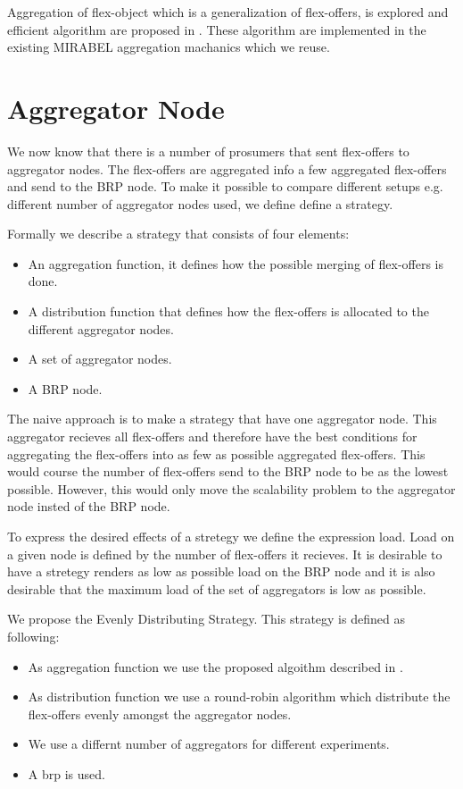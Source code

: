 \documentclass{ifacconf}
\begin{document}
Aggregation of flex-object which is a generalization of flex-offers, is explored and efficient algorithm are proposed in \cite{ssdbm}. 
These algorithm are implemented in the existing MIRABEL aggregation machanics which we reuse.

\section{Aggregator Node}

We now know that there is a number of prosumers that sent flex-offers to aggregator nodes. 
The flex-offers are aggregated info a few aggregated flex-offers and send to the BRP node.
To make it possible to compare different setups e.g. different number of aggregator nodes used, we define define a strategy.

Formally we describe a strategy that consists of four elements:
\begin{itemize}
	\item An aggregation function, it defines how the possible merging of flex-offers is done.
	\item A distribution function that defines how the flex-offers is allocated to the different aggregator nodes.
	\item A set of aggregator nodes.
	\item A BRP node.
\end{itemize} 


The naive approach is to make a strategy that have one aggregator node. 
This aggregator recieves all flex-offers and therefore have the best conditions for aggregating the flex-offers into as few as possible aggregated flex-offers. 
This would course the number of flex-offers send to the BRP node to be as the lowest possible. 
However, this would only move the scalability problem to the aggregator node insted of the BRP node. 

To express the desired effects of a stretegy we define the expression load.
Load on a given node is defined by the number of flex-offers it recieves.
It is desirable to have a stretegy renders as low as possible load on the BRP node and it is also desirable that the maximum load of the set of aggregators is low as possible.  


We propose the Evenly Distributing Strategy.
This strategy is defined as following:
\begin{itemize}
	\item As aggregation function we use the proposed algoithm described in \cite{ssdbm}.
	\item As distribution function we use a round-robin algorithm which distribute the flex-offers evenly amongst the aggregator nodes.
	\item We use a differnt number of aggregators for different experiments.
	\item A brp is used.
\end{itemize}
\end{document}
